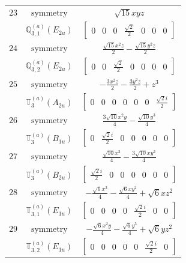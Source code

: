\documentclass[fleqn,8pt,landscape]{jsarticle}
\begin{document}
\begin{longtable}{ccc}
$ 23 $ & $ \text{symmetry} $ & $ \sqrt{15} x y z $ \\
$  $ & $ \mathbb{Q}_{3,1}^{(a)}(E_{2u}) $ & $ \begin{bmatrix} 0 & 0 & 0 & \frac{\sqrt{2}}{2} & 0 & 0 & 0 \end{bmatrix} $ \\ \hline
$ 24 $ & $ \text{symmetry} $ & $ \frac{\sqrt{15} x^{2} z}{2} - \frac{\sqrt{15} y^{2} z}{2} $ \\
$  $ & $ \mathbb{Q}_{3,2}^{(a)}(E_{2u}) $ & $ \begin{bmatrix} 0 & 0 & \frac{\sqrt{2}}{2} & 0 & 0 & 0 & 0 \end{bmatrix} $ \\ \hline
$ 25 $ & $ \text{symmetry} $ & $ - \frac{3 x^{2} z}{2} - \frac{3 y^{2} z}{2} + z^{3} $ \\
$  $ & $ \mathbb{T}_{3}^{(a)}(A_{2u}) $ & $ \begin{bmatrix} 0 & 0 & 0 & 0 & 0 & 0 & \frac{\sqrt{2} i}{2} \end{bmatrix} $ \\ \hline
$ 26 $ & $ \text{symmetry} $ & $ \frac{3 \sqrt{10} x^{2} y}{4} - \frac{\sqrt{10} y^{3}}{4} $ \\
$  $ & $ \mathbb{T}_{3}^{(a)}(B_{1u}) $ & $ \begin{bmatrix} 0 & \frac{\sqrt{2} i}{2} & 0 & 0 & 0 & 0 & 0 \end{bmatrix} $ \\ \hline
$ 27 $ & $ \text{symmetry} $ & $ \frac{\sqrt{10} x^{3}}{4} - \frac{3 \sqrt{10} x y^{2}}{4} $ \\
$  $ & $ \mathbb{T}_{3}^{(a)}(B_{2u}) $ & $ \begin{bmatrix} \frac{\sqrt{2} i}{2} & 0 & 0 & 0 & 0 & 0 & 0 \end{bmatrix} $ \\ \hline
$ 28 $ & $ \text{symmetry} $ & $ - \frac{\sqrt{6} x^{3}}{4} - \frac{\sqrt{6} x y^{2}}{4} + \sqrt{6} x z^{2} $ \\
$  $ & $ \mathbb{T}_{3,1}^{(a)}(E_{1u}) $ & $ \begin{bmatrix} 0 & 0 & 0 & 0 & \frac{\sqrt{2} i}{2} & 0 & 0 \end{bmatrix} $ \\ \hline
$ 29 $ & $ \text{symmetry} $ & $ - \frac{\sqrt{6} x^{2} y}{4} - \frac{\sqrt{6} y^{3}}{4} + \sqrt{6} y z^{2} $ \\
$  $ & $ \mathbb{T}_{3,2}^{(a)}(E_{1u}) $ & $ \begin{bmatrix} 0 & 0 & 0 & 0 & 0 & \frac{\sqrt{2} i}{2} & 0 \end{bmatrix} $ \\ \hline

\end{longtable}
\end{document}
